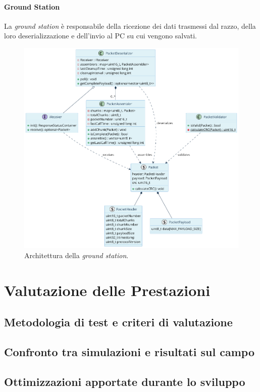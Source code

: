 \documentclass[12pt,a4paper,twoside]{book}
\begin{document}
\subsubsection{Ground Station}
La \emph{ground station} è responsabile della ricezione dei dati trasmessi dal
razzo, della loro deserializzazione e dell'invio al PC su cui vengono salvati.
\begin{figure}[H]
    \centering
    \includegraphics[width=\textwidth]{img/uml/ground-station.png}
    \caption{Architettura della \emph{ground station}.}
    \label{fig:ground-station-architecture}
\end{figure}

\chapter{Valutazione delle Prestazioni} \label{chap:performance}

\section{Metodologia di test e criteri di valutazione}
\section{Confronto tra simulazioni e risultati sul campo}
\section{Ottimizzazioni apportate durante lo sviluppo}
\end{document}
